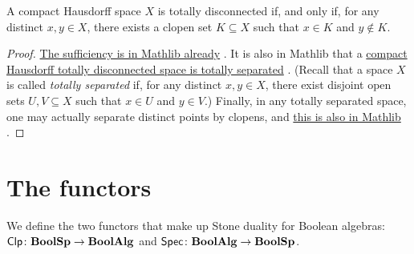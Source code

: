 \documentclass[a4paper,10pt]{article}
\numberwithin{theorem}{section}
\newcommand{\docref}[3]{%
    \href{%
        https://leanprover-community.github.io/mathlib4_docs/Mathlib/#1.html\##2%
    }{#3}%
}
\begin{document}
\begin{lemma}\label{BoolSpchar}
    A compact Hausdorff space $X$ is totally disconnected if, and only if, for
    any distinct $x, y \in X$, there exists a clopen set $K \subseteq X$ such
    that $x \in K$ and $y \not\in K$.
\end{lemma}
\begin{proof}
   \docref{Topology/Connected/TotallyDisconnected}{isTotallyDisconnected_of_isClopen_set}{The
   sufficiency is in Mathlib already}. It is also in Mathlib that a
   \docref{Topology/Separation}{instTotallySeparatedSpace}{compact
   Hausdorff totally disconnected space is totally separated}. (Recall that a
   space $X$ is called \emph{totally separated} if, for any distinct $x,y \in
   X$, there exist disjoint open sets $U, V \subseteq X$ such that $x \in U$
   and $y \in V$.) Finally, in any totally separated space, one may actually
   separate distinct points by clopens, and
   \docref{Topology/Connected/TotallyDisconnected}
   {exists_isClopen_of_totally_separated}{this is also in Mathlib}.
\end{proof}
\section{The functors}
We define the two functors that make up Stone duality for Boolean algebras:
$\operatorname*{\mathsf{Clp}} \colon \mathbf{BoolSp} \to \mathbf{BoolAlg}$ and $\operatorname*{\mathsf{Spec}} \colon \mathbf{BoolAlg} \to \mathbf{BoolSp}$.
\end{document}
